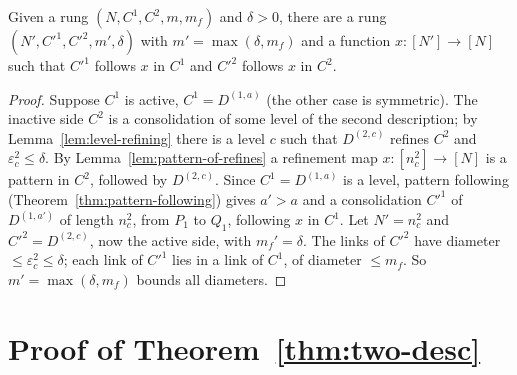 
\begin{lemma}\label{lem:next-rung}
Given a rung $(N,C^1,C^2,m,m_f)$ and $\delta>0$, there are a rung $(N',C'^1,C'^2,m',\delta)$ with $m'=\max(\delta,m_f)$ and a
function $x\colon[N']\to[N]$ such that $C'^1$ follows $x$ in $C^1$ and $C'^2$ follows $x$ in $C^2$.
\end{lemma}

\begin{proof}
Suppose $C^1$ is active, $C^1=D^{(1,a)}$ (the other case is symmetric). The inactive side $C^2$ is a consolidation of some level of
the second description; by Lemma~\ref{lem:level-refining} there is a level $c$ such that $D^{(2,c)}$ refines $C^2$ and
$\varepsilon^2_c\le\delta$. By Lemma~\ref{lem:pattern-of-refines} a refinement map $x\colon[n^2_c]\to[N]$ is a pattern in $C^2$, followed
by $D^{(2,c)}$. Since $C^1=D^{(1,a)}$ is a level, pattern following (Theorem~\ref{thm:pattern-following}) gives $a'>a$ and a
consolidation $C'^1$ of $D^{(1,a')}$ of length $n^2_c$, from $P_1$ to $Q_1$, following $x$ in $C^1$. Let $N'=n^2_c$ and
$C'^2=D^{(2,c)}$, now the active side, with $m_f'=\delta$. The links of $C'^2$ have diameter $\le\varepsilon^2_c\le\delta$; each link of
$C'^1$ lies in a link of $C^1$, of diameter $\le m_f$. So $m'=\max(\delta,m_f)$ bounds all diameters.
\end{proof}


\section{Proof of Theorem~\ref{thm:two-desc}}

